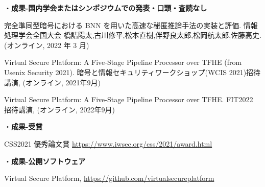 \noindent・\textbf{成果-国内学会またはシンポジウムでの発表・口頭・査読なし}
\begin{enumerate}[label={[\arabic*]},leftmargin=0.5cm]
    \setcounter{enumi}{4}
    \setlength{\parskip}{0cm} %
    \setlength{\itemsep}{0cm} %
     \item  完全準同型暗号における BNN を用いた高速な秘匿推論手法の実装と評価. 情報処理学会全国大会 橋詰陽太,古川修平,松本直樹,伴野良太郎,松岡航太郎,佐藤高史. (オンライン, 2022 年 3 月)\label{achieve:bnn}
	\item  Virtual Secure Platform: A Five-Stage Pipeline Processor over TFHE (from Usenix Security 2021). 暗号と情報セキュリティワークショップ(WCIS 2021)招待講演, (オンライン, 2021年9月) \label{achieve:wcis}
	\item  Virtual Secure Platform: A Five-Stage Pipeline Processor over TFHE. FIT2022 招待講演, (オンライン, 2022年9月)\label{achieve:fit}
\end{enumerate}


\noindent・\textbf{成果-受賞}
\begin{enumerate}[label={[\arabic*]},leftmargin=0.5cm]
    \setcounter{enumi}{7}
    \setlength{\parskip}{0cm} %
    \setlength{\itemsep}{0cm} %
	\label{achieve:mitou}
	\label{achieve:nhk}
	\label{achieve:vsp}
	\item CSS2021 優秀論文賞 \url{https://www.iwsec.org/css/2021/award.html} \label{achieve:css}
\end{enumerate}


・\noindent\textbf{成果-公開ソフトウェア}
\begin{enumerate}[label={[\arabic*]},leftmargin=0.5cm]
    \setcounter{enumi}{11}
    \setlength{\parskip}{0cm} %
    \setlength{\itemsep}{0cm} %
	\item Virtual Secure Platform, \url{https://github.com/virtualsecureplatform}\label{code:vsp}
\end{enumerate}

